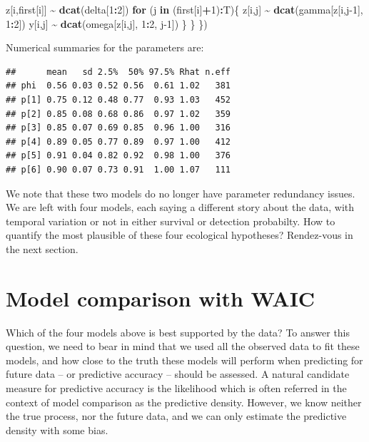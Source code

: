 \documentclass[
  12pt,
]{krantz}
\newenvironment{Shaded}{\begin{snugshade}}{\end{snugshade}}
\newcommand{\ControlFlowTok}[1]{\textcolor[rgb]{0.13,0.29,0.53}{\textbf{#1}}}
\newcommand{\DecValTok}[1]{\textcolor[rgb]{0.00,0.00,0.81}{#1}}
\newcommand{\FunctionTok}[1]{\textcolor[rgb]{0.13,0.29,0.53}{\textbf{#1}}}
\newcommand{\NormalTok}[1]{#1}
\newcommand{\SpecialCharTok}[1]{\textcolor[rgb]{0.81,0.36,0.00}{\textbf{#1}}}
\begin{document}
\begin{Shaded}
\begin{Highlighting}[]
\NormalTok{    z[i,first[i]] }\SpecialCharTok{\textasciitilde{}} \FunctionTok{dcat}\NormalTok{(delta[}\DecValTok{1}\SpecialCharTok{:}\DecValTok{2}\NormalTok{])}
    \ControlFlowTok{for}\NormalTok{ (j }\ControlFlowTok{in}\NormalTok{ (first[i]}\SpecialCharTok{+}\DecValTok{1}\NormalTok{)}\SpecialCharTok{:}\NormalTok{T)\{}
\NormalTok{      z[i,j] }\SpecialCharTok{\textasciitilde{}} \FunctionTok{dcat}\NormalTok{(gamma[z[i,j}\DecValTok{{-}1}\NormalTok{], }\DecValTok{1}\SpecialCharTok{:}\DecValTok{2}\NormalTok{])}
\NormalTok{      y[i,j] }\SpecialCharTok{\textasciitilde{}} \FunctionTok{dcat}\NormalTok{(omega[z[i,j], }\DecValTok{1}\SpecialCharTok{:}\DecValTok{2}\NormalTok{, j}\DecValTok{{-}1}\NormalTok{])}
\NormalTok{    \}}
\NormalTok{  \}}
\NormalTok{\})}
\end{Highlighting}
\end{Shaded}

Numerical summaries for the parameters are:

\begin{verbatim}
##      mean   sd 2.5%  50% 97.5% Rhat n.eff
## phi  0.56 0.03 0.52 0.56  0.61 1.02   381
## p[1] 0.75 0.12 0.48 0.77  0.93 1.03   452
## p[2] 0.85 0.08 0.68 0.86  0.97 1.02   359
## p[3] 0.85 0.07 0.69 0.85  0.96 1.00   316
## p[4] 0.89 0.05 0.77 0.89  0.97 1.00   412
## p[5] 0.91 0.04 0.82 0.92  0.98 1.00   376
## p[6] 0.90 0.07 0.73 0.91  1.00 1.07   111
\end{verbatim}

We note that these two models do no longer have parameter redundancy issues. We are left with four models, each saying a different story about the data, with temporal variation or not in either survival or detection probabilty. How to quantify the most plausible of these four ecological hypotheses? Rendez-vous in the next section.

\hypertarget{waic}{%
\section{Model comparison with WAIC}\label{waic}}

Which of the four models above is best supported by the data? To answer this question, we need to bear in mind that we used all the observed data to fit these models, and how close to the truth these models will perform when predicting for future data -- or predictive accuracy -- should be assessed. A natural candidate measure for predictive accuracy is the likelihood which is often referred in the context of model comparison as the predictive density. However, we know neither the true process, nor the future data, and we can only estimate the predictive density with some bias.
\end{document}
